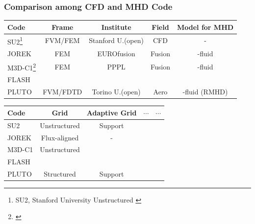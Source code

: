\begin{frame}[allowframebreaks]
\frametitle{Comparison among CFD and MHD Code}
\footnotesize{\tiny}

\begin{center}
\begin{tabular}{l >{\ttfamily}c >{\ttfamily}c >{\ttfamily}c >{\ttfamily}c}
\toprule
Code & Frame & Institute & Field & Model for MHD \\
\midrule
SU2\footnote{SU2, Stanford University Unstructured \parencite{SU2EconomonIntro}} & FVM/FEM & Stanford U.(open) & CFD &-\\
JOREK & FEM & EUROfusion &   Fusion & 2-fluid \\
M3D-C1\footnote{\textcite{M3DC1:Web}} & FEM & PPPL & Fusion& 2-fluid \\
FLASH &  &  \\
PLUTO & FVM/FDTD & Torino U.(open) & Aero & 1-fluid (RMHD)\\
\bottomrule
\end{tabular}
\end{center}

\begin{center}
\begin{tabular}{l >{\ttfamily}c >{\ttfamily}c >{\ttfamily}c >{\ttfamily}c}
\toprule
Code & Grid & Adaptive Grid & $\cdots$ & $\cdots$ \\
\midrule
SU2 & Unstructured & Support \\
JOREK & Flux-aligned & - & \\
M3D-C1 & Unstructured &\\
FLASH &  &  \\
PLUTO & Structured & Support &\\
\bottomrule
\end{tabular}
\end{center}
\end{frame}


